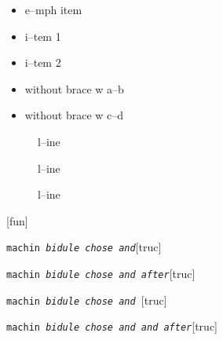 \documentclass{book}
\begin{document}
\begin{titlepage}
\begin{itemize}[label=\emph{} after emph]
\item e--mph item
\end{itemize}

\begin{itemize}[label=\textbullet{} a--n itemize line]
\item i--tem 1
\item i--tem 2
\end{itemize}

\begin{itemize}[label={}]
\item without brace w a--b
\item without brace w c--d
\end{itemize}

\begin{description}
\item[{\parbox[b]{\linewidth}{%
a}}]
l--ine
\end{description}

\begin{description}
\item[{\parbox[b]{\linewidth}{%
a--missing style formatting}}]
l--ine
\end{description}

\begin{description}
\item[{\parbox[b]{\linewidth}{%
a\\
\index[fn]{a@\texttt{a}}%
\index[cp]{index entry between item and itemx}%
b
\index[fn]{b@\texttt{b}}%
}}]
l--ine
\end{description}

\noindent\texttt{}\hfill[fun]



\noindent\texttt{machin \bgroup{}\normalfont{}\textsl{bidule chose and}\egroup{}}\hfill[truc]



%
\noindent\texttt{machin \bgroup{}\normalfont{}\textsl{bidule chose and  after}\egroup{}}\hfill[truc]



%
\noindent\texttt{machin \bgroup{}\normalfont{}\textsl{bidule chose and }\egroup{}}\hfill[truc]



%
\noindent\texttt{machin \bgroup{}\normalfont{}\textsl{bidule chose and and after}\egroup{}}\hfill[truc]




\end{titlepage}
\end{document}
